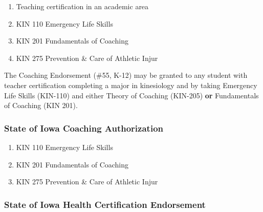 \documentclass[
  letterpaper,
]{scrbook}
\providecommand{\tightlist}{%
  \setlength{\itemsep}{0pt}\setlength{\parskip}{0pt}}
\begin{document}
\begin{enumerate}
\def\labelenumi{\arabic{enumi}.}
\tightlist
\item
  Teaching certification in an academic area\\
\item
  KIN 110 Emergency Life Skills\\
\item
  KIN 201 Fundamentals of Coaching\\
\item
  KIN 275 Prevention \& Care of Athletic Injur
\end{enumerate}

The Coaching Endorsement (\#55, K-12) may be granted to any student with
teacher certification completing a major in kinesiology and by taking
Emergency Life Skills (KIN-110) and either Theory of Coaching (KIN-205)
\textbf{or} Fundamentals of Coaching (KIN 201).

\subsubsection{State of Iowa Coaching
Authorization}\label{state-of-iowa-coaching-authorization}

\begin{enumerate}
\def\labelenumi{\arabic{enumi}.}
\tightlist
\item
  KIN 110 Emergency Life Skills\\
\item
  KIN 201 Fundamentals of Coaching\\
\item
  KIN 275 Prevention \& Care of Athletic Injur
\end{enumerate}

\subsubsection{State of Iowa Health Certification
Endorsement}\label{state-of-iowa-health-certification-endorsement}
\end{document}

